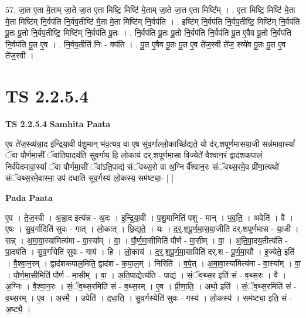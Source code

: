 \documentclass[17pt]{extarticle}
\begin{document}
57. जा॒त ए॒ता मे॒ताम् जा॒ते जा॒त ए॒ता मिष्टि॒ मिष्टि॑ मे॒ताम् जा॒ते जा॒त ए॒ता मिष्टि᳚म् । . ए॒ता मिष्टि॒ मिष्टि॑ मे॒ता मे॒ता मिष्टि॑म् नि॒र्वप॑ति नि॒र्वप॒तीष्टि॑ मे॒ता मे॒ता मिष्टि॑म् नि॒र्वप॑ति । . इष्टि॑म् नि॒र्वप॑ति नि॒र्वप॒तीष्टि॒ मिष्टि॑म् नि॒र्वप॑ति पू॒तः पू॒तो नि॒र्वप॒तीष्टि॒ मिष्टि॑म् नि॒र्वप॑ति पू॒तः । . नि॒र्वप॑ति पू॒तः पू॒तो नि॒र्वप॑ति नि॒र्वप॑ति पू॒त ए॒वैव पू॒तो नि॒र्वप॑ति नि॒र्वप॑ति पू॒त ए॒व । . नि॒र्वप॒तीति॑ निः - वप॑ति । . पू॒त ए॒वैव पू॒तः पू॒त ए॒व ते॑ज॒स्वी ते॑ज॒ स्व्ये॑व पू॒तः पू॒त ए॒व ते॑ज॒स्वी । \newline
\pagebreak
{}
\section*{ TS 2.2.5.4 }

\textbf{TS 2.2.5.4 } \newline
\textbf{Samhita Paata} \newline

ए॒व ते॑ज॒स्व्य॑न्ना॒द इ॑न्द्रिया॒वी प॑शु॒मान् भ॑व॒त्यव॒ वा ए॒ष सु॑व॒र्गाल्लो॒काच्छि॑द्यते॒ यो द॑र्.शपूर्णमासया॒जी सन्न॑मावा॒स्यां᳚ ॅवा पौर्णमा॒सीं ॅवा॑तिपा॒दय॑ति सुव॒र्गाय॒ हि लो॒काय॑ दर्.शपूर्णमा॒सा वि॒ज्येते॑ वैश्वान॒रं द्वाद॑शकपालं॒ निर्व॑पेदमावा॒स्यां᳚ ॅवा पौर्णमा॒सीं ॅवा॑ऽति॒पाद्य॑ संॅवथ्स॒रो वा अ॒ग्नि र्वै᳚श्वान॒रः सं॑ॅवथ्स॒रमे॒व प्री॑णा॒त्यथो॑ संॅवथ्स॒रमे॒वास्मा॒ उप॑ दधाति सुव॒र्गस्य॑ लो॒कस्य॒ सम॑ष्ट्या॒-  [  ] \newline

\textbf{Pada Paata} \newline

ए॒व । ते॒ज॒स्वी । अ॒न्ना॒द इत्य॑न्न - अ॒दः । इ॒न्द्रि॒या॒वी । प॒शु॒मानिति॑ पशु - मान् । भ॒व॒ति॒ । अवेति॑ । वै । ए॒षः । सु॒व॒र्गादिति॑ सुवः - गात् । लो॒कात् । छि॒द्य॒ते॒ । यः । द॒र्॒.श॒पू॒र्ण॒मा॒स॒या॒जीति॑ दर्.शपूर्णमास - या॒जी । सन्न् । अ॒मा॒वा॒स्या॑मित्य॑मा - वा॒स्या᳚म् । वा॒ । पौ॒र्ण॒मा॒सीमिति॑ पौर्ण - मा॒सीम् । वा॒ । अ॒ति॒पा॒दय॒तीत्य॑ति - पा॒दय॑ति । सु॒व॒र्गायेति॑ सुवः - गाय॑ । हि । लो॒काय॑ । द॒र्॒.श॒पू॒र्ण॒मा॒साविति॑ दर्.श - पू॒र्ण॒मा॒सौ । इ॒ज्येते॒ इति॑ । वै॒श्वा॒न॒रम् । द्वाद॑शकपाल॒मिति॒ द्वाद॑श - क॒पा॒ल॒म् । निरिति॑ । व॒पे॒त् । अ॒मा॒वा॒स्या॑मित्य॑मा - वा॒स्या᳚म् । वा॒ । पौ॒र्ण॒मा॒सीमिति॑ पौर्ण - मा॒सीम् । वा॒ । अ॒ति॒पाद्येत्य॑ति - पाद्य॑ । सं॒ॅव॒थ्स॒र इति॑ सं - व॒थ्स॒रः । वै । अ॒ग्निः । वै॒श्वा॒न॒रः । सं॒ॅव॒थ्स॒रमिति॑ सं - व॒थ्स॒रम् । ए॒व । प्री॒णा॒ति॒ । अथो॒ इति॑ । सं॒ॅव॒थ्स॒रमिति॑ सं - व॒थ्स॒रम् । ए॒व । अ॒स्मै॒ । उपेति॑ । द॒धा॒ति॒ । सु॒व॒र्गस्येति॑ सुवः - गस्य॑ । लो॒कस्य॑ । सम॑ष्ट्या॒ इति॒ सं - अ॒ष्ट्यै॒ ।  \newline
\end{document}
